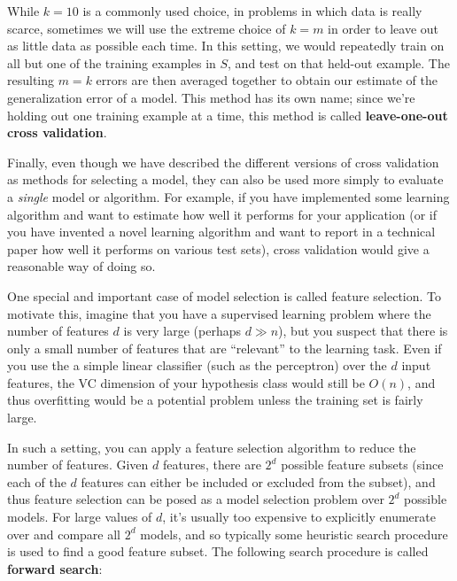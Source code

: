 While $k = 10$ is a commonly used choice, in problems in which data is
really scarce, sometimes we will use the extreme choice of $k = m$ in order
to leave out as little data as possible each time. In this setting, we would
repeatedly train on all but one of the training examples in $S$, and test on that
held-out example. The resulting $m = k$ errors are then averaged together to
obtain our estimate of the generalization error of a model. This method has
its own name; since we're holding out one training example at a time, this
method is called \textbf{leave-one-out cross validation}.

Finally, even though we have described the different versions of cross
validation as methods for selecting a model, they can also be used more simply to
evaluate a \textit{single} model or algorithm. For example, if you have implemented
some learning algorithm and want to estimate how well it performs for your
application (or if you have invented a novel learning algorithm and want to
report in a technical paper how well it performs on various test sets), cross
validation would give a reasonable way of doing so.


\vspace{1cm}
One special and important case of model selection is called feature selection.
To motivate this, imagine that you have a supervised learning problem where
the number of features $d$ is very large (perhaps $d \gg n$), but you suspect that
there is only a small number of features that are ``relevant'' to the learning
task. Even if you use the a simple linear classifier (such as the perceptron)
over the $d$ input features, the VC dimension of your hypothesis class would
still be $O(n)$, and thus overfitting would be a potential problem unless the
training set is fairly large.

In such a setting, you can apply a feature selection algorithm to reduce the
number of features. Given $d$ features, there are $2^d$ possible feature subsets
(since each of the $d$ features can either be included or excluded from the
subset), and thus feature selection can be posed as a model selection problem
over $2^d$ possible models. For large values of $d$, it's usually too expensive to
explicitly enumerate over and compare all $2^d$ models, and so typically some
heuristic search procedure is used to find a good feature subset. The following
search procedure is called \textbf{forward search}:

